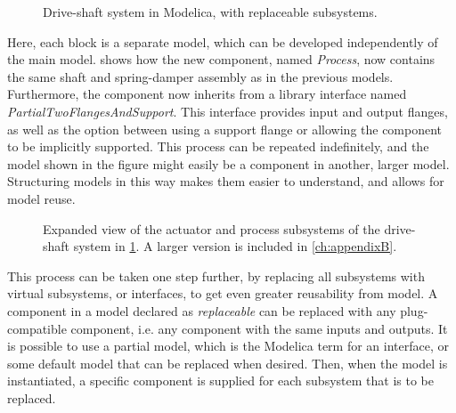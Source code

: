 \documentclass[\rootfolder/main.tex]{subfiles}
\begin{document}
\begin{figure}[ht]
    \caption{Drive-shaft system in Modelica, with replaceable subsystems.\label{fig:modelica-inertial-architecture}}
\end{figure}

Here, each block is a separate model, which can be developed independently of the main model.
 shows how the new component, named \emph{Process}, now contains the same shaft and spring-damper assembly as in the previous models.
Furthermore, the component now inherits from a library interface named \emph{PartialTwoFlangesAndSupport}.
This interface provides input and output flanges, as well as the option between using a support flange or allowing the component to be implicitly supported.
This process can be repeated indefinitely, and the model shown in the figure might easily be a component in another, larger model.
Structuring models in this way makes them easier to understand, and allows for model reuse.

\begin{figure}[ht]
    \caption[Expanded view of the actuator and process subsystems of the drive-shaft system in \cref{fig:modelica-inertial-architecture}.]%
    {Expanded view of the actuator and process subsystems of the drive-shaft system in \cref{fig:modelica-inertial-architecture}. A larger version is included in \cref{ch:appendixB}.\label{fig:modelica-inertial-architecture-blowup}}
\end{figure}

This process can be taken one step further, by replacing all subsystems with virtual subsystems, or interfaces, to get even greater reusability from model.
A component in a model declared as \emph{replaceable} can be replaced with any plug-compatible component, i.e. any component with the same inputs and outputs.
It is possible to use a partial model, which is the Modelica term for an interface, or some default model that can be replaced when desired.
Then, when the model is instantiated, a specific component is supplied for each subsystem that is to be replaced.

\begin{listing}[ht]
    \inputminted{Modelica}{\rootfolder/Models/MasterProject/Models/Inertial.mo}
    \caption{Modelica example showing the instantiation of the drive-shaft system in \cref{fig:modelica-inertial-architecture}.\label{lst:modelica-inertial-instantiation}}
\end{listing}
\end{document}

